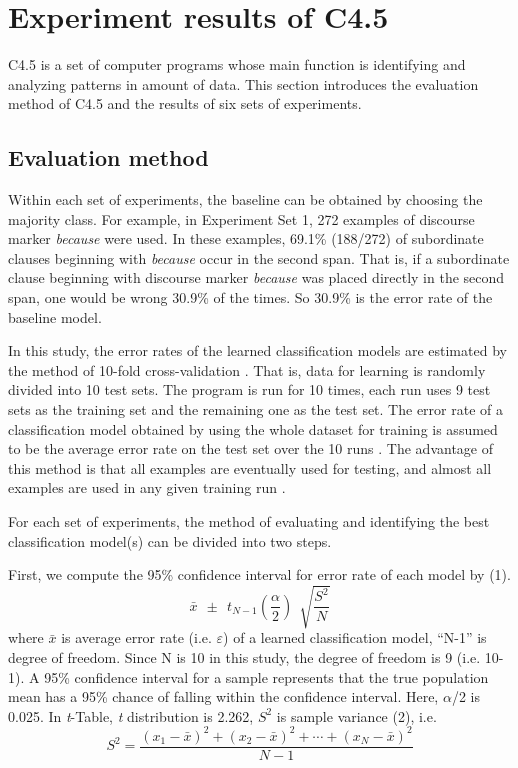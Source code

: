 \documentclass[english]{jnlp_1.3e}
\begin{document}
\section{Experiment results of C4.5} 

C4.5 is a set of computer programs whose main function is identifying and
analyzing patterns in amount of data. This section introduces the evaluation 
method of C4.5 and the results of six sets of experiments. 

\subsection{Evaluation method} 

Within each set of experiments, the baseline can be obtained by choosing 
the majority class. For example, in Experiment Set 1, 272 examples of
discourse marker \textit{because} were used. In these examples, 
69.1\% (188/272) of subordinate clauses beginning with \textit{because} 
occur in the second span. That is, if a subordinate clause beginning 
with discourse marker \textit{because} was placed directly in the second 
span, one would be wrong 30.9\% of the times. So 30.9\% is the error 
rate of the baseline model. 

In this study, the error rates of the learned classification models are estimated by
the method of 10-fold cross-validation \cite{Weiss91}. That is, data for
learning is randomly divided into 10 test sets. The program is run for 10 times,
each run uses 9 test sets as the training set and the remaining one as the test set.
The error rate of a classification model obtained by using the whole dataset for training 
is assumed to be the average error rate on the test set over the 10 runs 
\cite{Eugenio97}. The advantage of this method is that all examples 
are eventually used for testing, and almost all examples are used in any 
given training run \cite{Litman96}. 

For each set of experiments, the method of evaluating and identifying the best
classification model(s) can be divided into two steps.

First, we compute the 95\% confidence interval for error rate of each model by (1). 
\begin{equation}
   \bar{x}~~\pm~~t_{N-1}\left( \frac{\alpha}{2} \right)~~\sqrt{\frac{S^2}{N}}
\end{equation}
where $\bar{x}$ is average error rate (i.e. $\varepsilon$) of a learned classification
model, ``N-1'' is degree of freedom. Since N is 10 in this study, the degree of
freedom is 9 (i.e. 10-1). A 95\% confidence interval for a sample represents that
the true population mean has a 95\% chance of falling within the confidence interval.
Here, $\alpha$/2 is 0.025. In {\textit{t}}-Table, {\textit{t}} distribution is 2.262,
$S^2$ is sample variance (2), i.e. 
\begin{equation}
   S^2 = \frac{\left( x_1 - \bar{x} \right)^2 + \left( x_2 - \bar{x} \right)^2 + \cdots + \left( x_N - \bar{x} \right)^2}{N-1}
\end{equation}
\end{document}
